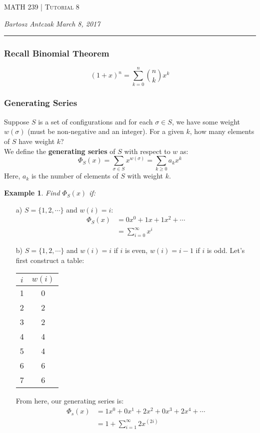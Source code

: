 \documentclass{report}
\newcommand{\lectureNum}{8}
\newcommand{\curDate}{March 8, 2017}
\newcommand{\course}{MATH 239}
\newtheorem{ex}{Example}[section]
\begin{document}
\begin{center}
\begin{Large}
\textsc{\course{} | Tutorial \lectureNum{}}
\end{Large}
\end{center} 
\noindent \textit{Bartosz Antczak} \hfill
\textit{\curDate{}}
\rule{\textwidth}{0.4pt}
\subsubsection{Recall Binomial Theorem}
$$(1+x)^n = \sum_{k=0}^n {n \choose k}x^k$$
\subsubsection{Generating Series}
Suppose $S$ is a set of configurations and for each $\sigma \in S$, we have some weight $w(\sigma)$ (must be non-negative and an integer). For a given $k$, how many elements of $S$ have weight $k$?\\
We define the \textbf{generating series} of $S$ with respect to $w$ as:
$$\Phi_{S}(x) = \sum_{\sigma \in S}x^{w(\sigma)} = \sum_{k \geq 0} a_kx^k$$
Here, $a_k$ is the number of elements of $S$ with weight $k$.
\begin{ex}
Find $\Phi_S(x)$ if:
\end{ex}
\begin{enumerate}
\item[a)] $S = \{1,2, \cdots\}$ and $w(i) = i$:
\begin{align*}
\Phi_S(x) &= 0x^0 + 1x + 1x^2 + \cdots \\
&= \sum_{i=0}^\infty x^i
\end{align*}
\item[b)] $S = \{1,2, \cdots\}$ and $w(i) = i$ if $i$ is even, $w(i) = i-1$ if $i$ is odd. Let's first construct a table:
\begin{center}
\begin{tabular}{ c | c }
$i$ & $w(i)$ \\\hline
1 & 0 \\
2 & 2 \\
3 & 2 \\
4 & 4 \\
5 & 4 \\
6 & 6 \\
7 & 6 \\
\end{tabular}
\end{center}
From here, our generating series is:
\begin{align*}
\Phi_{s}(x) &= 1x^0 + 0x^1 + 2x^2 + 0x^3 + 2x^4 + \cdots \\
&= 1 + \sum_{i=1}^\infty 2x^{(2i)}
\end{align*}
\end{enumerate}\newpage
\end{document}
